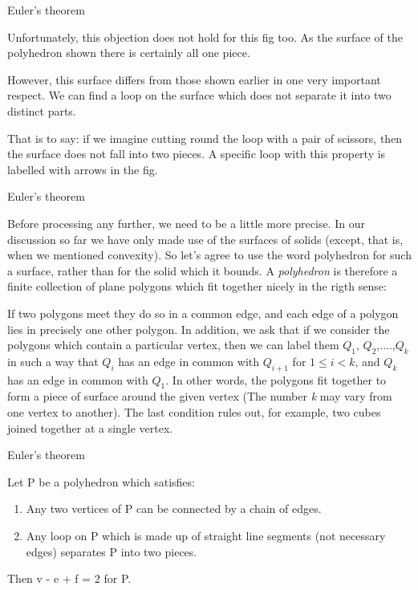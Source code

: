 \documentclass{beamer}
\begin{document}
\begin{frame}{Euler's theorem}
  \begin{block}{}
    Unfortunately, this objection does not hold for this fig too. As the surface of the polyhedron shown there is certainly all one piece.
  \end{block}
  \begin{block}{}
    However, this surface differs from those shown earlier in one very important respect. We can find a loop on the surface which does not separate it into two distinct parts.
  \end{block}
  \begin{block}{}
    That is to say: if we imagine cutting round the loop with a pair of scissors, then the surface does not fall into two pieces. A specific loop with this property is labelled with arrows in the fig.
  \end{block}
\end{frame}

\begin{frame}{Euler's theorem}
  \begin{block}{}
    Before processing any further, we need to be a little more precise. In our discussion so far we have only made use of the surfaces of solids (except, that is, when we mentioned convexity). So let's agree to use the word polyhedron for such a surface, rather than for the solid which it bounds. A \textsl{polyhedron} is therefore a finite collection of plane polygons which fit together nicely in the rigth sense:
  \end{block}
  \begin{block}{}
    If two polygons meet they do so in a common edge, and each edge of a polygon lies in precisely one other polygon. In addition, we ask that if we consider the polygons which contain a particular vertex, then we can label them $Q_1$, $Q_2$,....,$Q_k$ in such a way that $Q_i$ has an edge in common with $Q_{i+1}$ for $1 \leq i < k$, and $Q_k$ has an edge in common with $Q_1$. In other words, the polygons fit together to form a piece of surface around the given vertex (The number \textsl{k} may vary from one vertex to another). The last condition rules out, for example, two cubes joined together at a single vertex.
  \end{block}
\end{frame}

\begin{frame}{Euler's theorem}
  \begin{theorem}
    Let P be a polyhedron which satisfies:
    \begin{enumerate}[label={(\alph*)}]
    \item Any two vertices of P can be connected by a chain of edges.
    \item Any loop on P which is made up of straight line segments (not necessary edges) separates P into two pieces.
    \end{enumerate}
    Then v - e + f = 2 for P.
  \end{theorem}
\end{frame}
\end{document}

